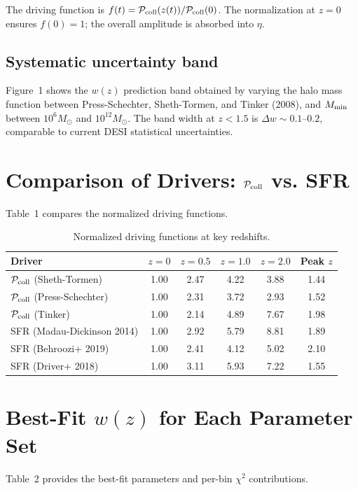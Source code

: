 \documentclass[aps,prd,onecolumn]{revtex4-2}
\begin{document}
The driving function is $f(t) = \mathcal{P}_{\rm coll}(z(t))/\mathcal{P}_{\rm coll}(0)$. The normalization at $z=0$ ensures $f(0)=1$; the overall amplitude is absorbed into $\eta$.

\subsection{Systematic uncertainty band}

Figure~1 shows the $w(z)$ prediction band obtained by varying the halo mass function between Press-Schechter, Sheth-Tormen, and Tinker (2008), and $M_{\rm min}$ between $10^6 M_\odot$ and $10^{12} M_\odot$. The band width at $z < 1.5$ is $\Delta w \sim 0.1$--$0.2$, comparable to current DESI statistical uncertainties.

\section{Comparison of Drivers: $\mathcal{P}_{\rm coll}$ vs. SFR}

Table~1 compares the normalized driving functions.

\begin{table}[h]
\centering
\caption{Normalized driving functions at key redshifts.}
\begin{tabular}{lccccc}
\toprule
Driver & $z=0$ & $z=0.5$ & $z=1.0$ & $z=2.0$ & Peak $z$ \\
\midrule
$\mathcal{P}_{\rm coll}$ (Sheth-Tormen) & 1.00 & 2.47 & 4.22 & 3.88 & 1.44 \\
$\mathcal{P}_{\rm coll}$ (Press-Schechter) & 1.00 & 2.31 & 3.72 & 2.93 & 1.52 \\
$\mathcal{P}_{\rm coll}$ (Tinker) & 1.00 & 2.14 & 4.89 & 7.67 & 1.98 \\
SFR (Madau-Dickinson 2014) & 1.00 & 2.92 & 5.79 & 8.81 & 1.89 \\
SFR (Behroozi+ 2019) & 1.00 & 2.41 & 4.12 & 5.02 & 2.10 \\
SFR (Driver+ 2018) & 1.00 & 3.11 & 5.93 & 7.22 & 1.55 \\
\bottomrule
\end{tabular}
\end{table}

\section{Best-Fit $w(z)$ for Each Parameter Set}

Table~2 provides the best-fit parameters and per-bin $\chi^2$ contributions.
\end{document}
